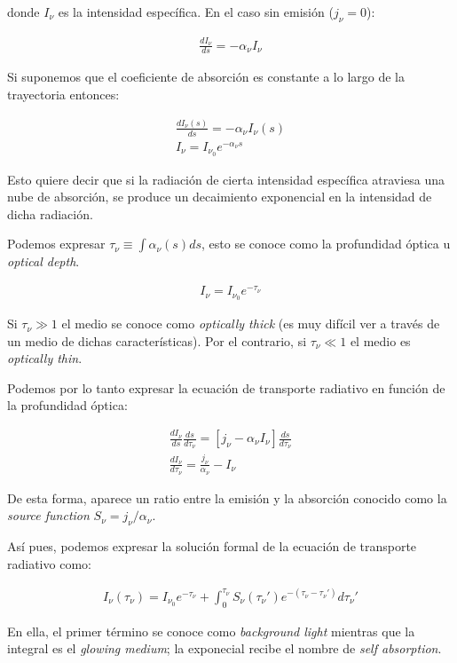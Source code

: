 \documentclass{tufte-handout}
\begin{document}
donde $I_\nu$ es la intensidad específica. En el caso sin emisión ($j_\nu = 0$):

\begin{align}
  \frac{dI_\nu}{ds} = - \alpha_\nu I_\nu
\end{align}

Si suponemos que el coeficiente de absorción es constante a lo largo de la trayectoria entonces:

\begin{align}
  \frac{dI_\nu(s)}{ds} = - \alpha_\nu I_\nu(s)\\
  I_\nu = I_{\nu_0} e^{- \alpha_\nu s}
\end{align}

Esto quiere decir que si la radiación de cierta intensidad específica atraviesa una nube de absorción, se produce un decaimiento exponencial en la intensidad de dicha radiación.

Podemos expresar $\tau_\nu \equiv \int \alpha_\nu(s) ds$, esto se conoce como la profundidad óptica u \emph{optical depth}.

\begin{align}
  I_\nu = I_{\nu_0} e^{-\tau_\nu}
\end{align}

Si $\tau_\nu \gg 1$ el medio se conoce como \emph{optically thick} (es muy difícil ver a través de un medio de dichas características). Por el contrario, si $\tau_\nu \ll 1$ el medio es \emph{optically thin}.

Podemos por lo tanto expresar la ecuación de transporte radiativo en función de la profundidad óptica:

\begin{align}
  \frac{dI_\nu}{ds}\frac{ds}{d\tau_\nu} = [j_\nu - \alpha_\nu I_\nu]\frac{ds}{d\tau_\nu}\\
  \frac{dI_\nu}{d\tau_\nu} = \frac{j_\nu}{\alpha_\nu} - I_\nu
\end{align}

De esta forma, aparece un ratio entre la emisión y la absorción conocido como la \emph{source function} $ S_\nu = j_\nu / \alpha_\nu$.

Así pues, podemos expresar la solución formal de la ecuación de transporte radiativo como:

\begin{align}
I_\nu(\tau_\nu) = I_{\nu_0}e^{-\tau_\nu} + \int_0^{\tau_\nu} S_\nu(\tau_\nu')e^{-(\tau_\nu - \tau_\nu')}d\tau_\nu'
\end{align}

En ella, el primer término se conoce como \emph{background light} mientras que la integral es el \emph{glowing medium}; la exponecial recibe el nombre de \emph{self absorption}.
\end{document}
